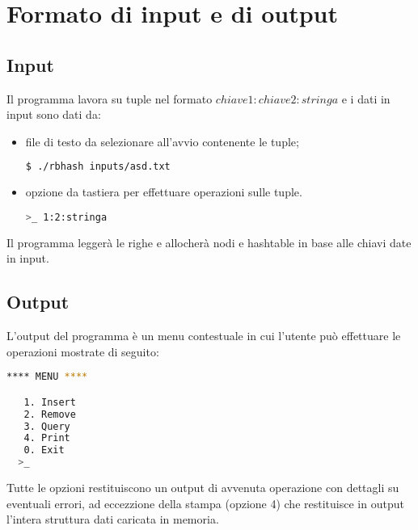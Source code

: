\def\baselinestretch{1}
\section{Formato di input e di output}
\def\baselinestretch{1.66}
\thispagestyle{headings}

\subsection{Input}
\indent Il programma lavora su tuple nel formato $chiave1:chiave2:stringa$ e i dati in input sono dati da:
\begin{itemize}
    \item file di testo da selezionare all'avvio contenente le tuple;
    \begin{lstlisting}[language=bash]
    $ ./rbhash inputs/asd.txt
    \end{lstlisting}
    \item opzione da tastiera per effettuare operazioni sulle tuple.
     \begin{lstlisting}[language=bash]
    >_ 1:2:stringa
    \end{lstlisting}
\end{itemize}
Il programma legger\`a le righe e allocher\`a nodi e hashtable in base alle chiavi date in input.
\subsection{Output}
L'output del programma \`e un menu contestuale in cui l'utente pu\`o effettuare le operazioni
mostrate di seguito:


\begin{lstlisting}[language=bash]
  **** MENU ****

   1. Insert
   2. Remove
   3. Query
   4. Print
   0. Exit
  >_
\end{lstlisting}


\noindent Tutte le opzioni restituiscono un output di avvenuta operazione con dettagli su eventuali errori,
ad eccezzione della stampa (opzione 4) che restituisce in output l'intera struttura dati caricata
in memoria.